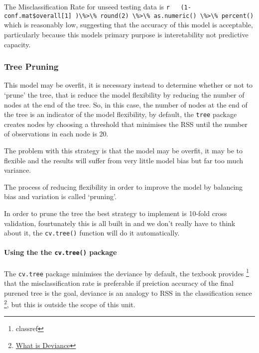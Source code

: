 \documentclass[
]{article}
\newcommand{\passthrough}[1]{#1}
\begin{document}
The Misclassification Rate for unseed testing data is
\passthrough{\lstinline!r   (1-conf.mat$overall[1] )\%>\% round(2) \%>\% as.numeric() \%>\% percent()!}
which is reasonably low, suggesting that the accuracy of this model is
acceptable, particularly because this models primary purpose is
interetability not predictive capacity.

\hypertarget{tree-pruning}{%
\subsubsection{Tree Pruning}\label{tree-pruning}}

This model may be overfit, it is necessary instead to determine whether
or not to `prune' the tree, that is reduce the model flexibility by
reducing the number of nodes at the end of the tree. So, in this case,
the number of nodes at the end of the tree is an indicator of the model
flexibility, by default, the \passthrough{\lstinline!tree!} package
creates nodes by choosing a threshold that minimises the RSS until the
number of observations in each node is 20.

The problem with this strategy is that the model may be overfit, it may
be to flexible and the results will suffer from very little model bias
but far too much variance.

The process of reducing flexibility in order to improve the model by
balancing bias and variation is called `pruning'.

In order to prune the tree the best strategy to implement is 10-fold
cross validation, fourtunately this is all built in and we don't really
have to think about it, the \passthrough{\lstinline!cv.tree()!} function
will do it automatically.

\hypertarget{using-the-the-cv.tree-package}{%
\paragraph{\texorpdfstring{Using the the \texttt{cv.tree()}
package}{Using the the cv.tree() package}}\label{using-the-the-cv.tree-package}}

The \passthrough{\lstinline!cv.tree!} package minimises the deviance by
default, the texbook provides \footnote{classref} that the
misclassification rate is preferable if preiction accuracy of the final
purened tree is the goal, deviance is an analogy to RSS in the
classification sence \footnote{\href{https://stats.stackexchange.com/a/6610}{What
  is Deviance}}, but this is outside the scope of this unit.
\end{document}
